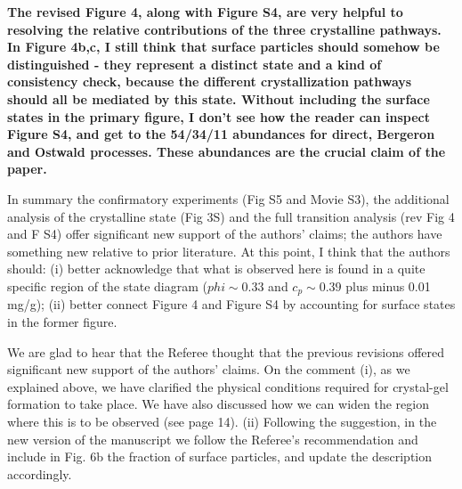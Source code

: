 \documentclass[11pt,a4paper]{article}
\newenvironment{referee}%
{\bigskip\singlespacing\bf}%
{\par\bigskip}
\begin{document}
\begin{referee}
 The revised Figure 4, along with Figure S4, are very helpful to resolving the relative contributions of the three crystalline pathways. In Figure 4b,c, I still think that surface particles should somehow be distinguished - they represent a distinct state and a kind of consistency check, because the different crystallization pathways should all be mediated by this state. Without including the surface states in the primary figure, I don't see how the reader can inspect Figure S4, and get to the 54/34/11 abundances for direct, Bergeron and Ostwald processes. These abundances are the crucial claim of the paper.

In summary the confirmatory experiments (Fig S5 and Movie S3), the additional analysis of the crystalline state (Fig 3S) and the full transition analysis (rev Fig 4 and F S4) offer significant new support of the authors' claims; the authors have something new relative to prior literature. At this point, I think that the authors should: (i) better acknowledge that what is observed here is found in a quite specific region of the state diagram ($phi\sim 0.33$ and $c_p\sim 0.39$ {plus minus} 0.01 mg/g); (ii) better connect Figure 4 and Figure S4 by accounting for surface states in the former figure.
 
\end{referee}

We are glad to hear that the Referee thought that the previous revisions offered significant new support of the authors' claims. 
On the comment (i), as we explained above, we have clarified the physical conditions required for crystal-gel formation to take place. We have also discussed how we can widen the region where this is to be observed (see page 14). 
(ii) Following the suggestion, in the new version of the manuscript we follow the Referee's recommendation and include in Fig. 6b the fraction of surface particles, and update the description accordingly.   


\end{document}
